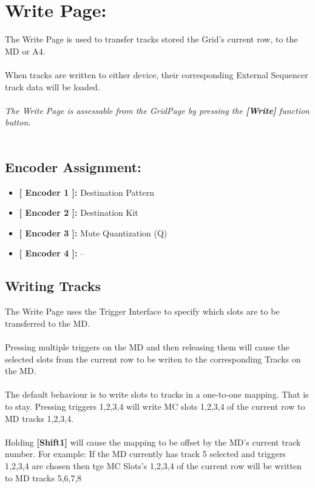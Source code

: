 \chapter{Write Page:}

The Write Page is used to transfer tracks stored the Grid's current row, to the MD or A4.\\
\\
When tracks are written to either device, their corresponding External Sequencer track data will be loaded.
\\\\
\textit{The Write Page is assessable from the GridPage by pressing the  \textbf{[Write]} function button.}
\\\\
\section{Encoder Assignment:}
\begin{itemize}
	\item \textbf{[ Encoder 1 ]: }Destination Pattern
	\item \textbf{[ Encoder 2 ]: }Destination Kit
	\item \textbf{[ Encoder 3 ]: }Mute Quantization (Q)
	\item \textbf{[ Encoder 4 ]: }--
\end{itemize}
\section{Writing Tracks}
The Write Page uses the Trigger Interface to specify which slots are to be transferred to the MD.\\
\\
Pressing multiple triggers on the MD and then releasing them will cause the selected slots from the current row to be writen to the corresponding Tracks on the MD.
\\
\\The default behaviour is to write slots to tracks in a one-to-one mapping. That is to stay. Pressing triggers 1,2,3,4 will write MC slots 1,2,3,4 of the current row to MD tracks 1,2,3,4.\\
\\
Holding  \textbf{[Shift1]} will cause the mapping to be offset by the MD's current track number. For example: If the MD currently has track 5 selected and triggers 1,2,3,4 are chosen then tge MC Slots's 1,2,3,4 of the current row will be written to MD tracks 5,6,7,8
